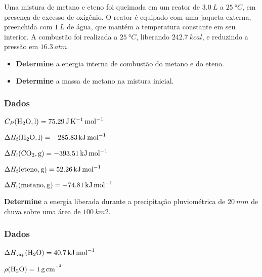 \documentclass[braun, twocolumn]{braun}
\begin{document}
\begin{problem}
[2A32]Uma mistura de metano e eteno foi queimada em um reator de
\(\qty{3,0}{L}\) a \(\qty{25}{\degree C}\), em presença de excesso de
oxigênio. O reator é equipado com uma jaqueta externa, preenchida com
\(\qty{1}{L}\) de água, que mantém a temperatura constante em seu
interior. A combustão foi realizada a \(\qty{25}{\degree C}\), liberando
\(\qty{242,7}{kcal}\), e reduzindo a pressão em \(\qty{16,3}{atm}\).

\begin{itemize}

\item
  \textbf{Determine} a energia interna de combustão do metano e do
  eteno.
\item
  \textbf{Determine} a massa de metano na mistura inicial.
\end{itemize}
\subsubsection*{Dados}


\begin{datalist}

\item $C_P(\ce{H2O, {l}}) = \qty{75,29}{J.K^{-1}.mol^{-1}}$
\item $\Delta H_\text{f}(\ce{H2O, {l}}) = \qty{-285,83}{kJ.mol^{-1}}$
\item $\Delta H_\text{f}(\ce{CO2, {g}}) = \qty{-393,51}{kJ.mol^{-1}}$
\item $\Delta H_\text{f}(\ce{eteno, {g}}) = \qty{52,26}{kJ.mol^{-1}}$
\item $\Delta H_\text{f}(\ce{metano, {g}}) = \qty{-74,81}{kJ.mol^{-1}}$
\end{datalist}

\end{problem}



\begin{problem}
[2A33]\textbf{Determine} a energia liberada durante a precipitação
pluviométrica de \(\qty{20}{mm}\) de chuva sobre uma área de
\(\qty{100}{km2}\).
\subsubsection*{Dados}


\begin{datalist}

\item $\Delta H_\text{vap}(\ce{H2O}) = \qty{40,7}{kJ.mol^{-1}}$
\item $\rho(\ce{H2O}) = \qty{1}{g.cm^{^{-3}}}$
\end{datalist}

\end{problem}
\end{document}
